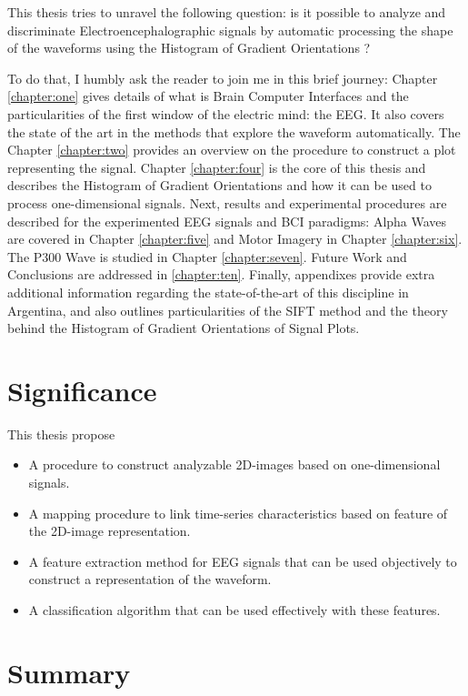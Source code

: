 This thesis tries to unravel the following question:  is it possible to analyze and discriminate Electroencephalographic signals by automatic processing the shape of the waveforms using the Histogram of Gradient Orientations ?

To do that, I humbly ask the reader to join me in this brief journey:  Chapter  \ref{chapter:one} gives details of what is Brain Computer Interfaces and the particularities of the first window of the electric mind: the EEG. It also covers the state of the art in the methods that explore the waveform automatically.  The Chapter \ref{chapter:two} provides an overview on the procedure to construct a plot representing the signal. Chapter \ref{chapter:four} is the core of this thesis and describes the Histogram of Gradient Orientations and how it can be used to process one-dimensional signals.
Next, results and experimental procedures are described for the experimented EEG signals and  BCI paradigms:  Alpha Waves are covered in Chapter \ref{chapter:five} and Motor Imagery in Chapter \ref{chapter:six}. The P300 Wave is studied in Chapter \ref{chapter:seven}.  Future Work and Conclusions are addressed in \ref{chapter:ten}.  Finally, appendixes provide extra additional information regarding the state-of-the-art of this discipline in Argentina, and also outlines particularities of the SIFT method and the theory behind the Histogram of Gradient Orientations of Signal Plots.

\section{Significance}

This thesis propose

\begin{itemize}
\item A procedure to construct analyzable 2D-images based on one-dimensional signals.
\item A mapping procedure to link time-series characteristics based on feature of the 2D-image representation.
\item A feature extraction method for EEG signals that can be used objectively to construct a representation of the waveform.
\item A classification algorithm that can be used effectively with these features.
\end{itemize}

\section{Summary}

